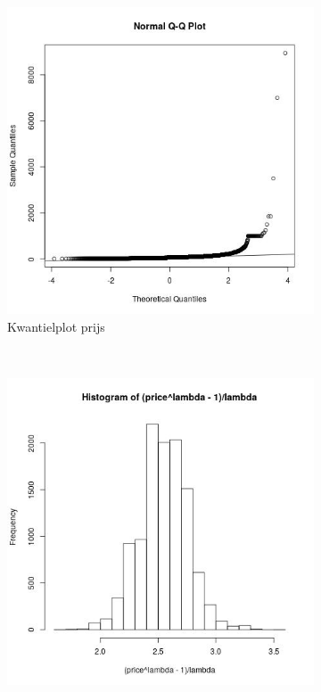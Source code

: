 \documentclass[a4paper,kulak]{kulakarticle} %
\begin{document}
\begin{figure}[H]
\begin{subfigure}[b]{0.23\textwidth}
		\includegraphics[width=\textwidth]{qqp.jpg}
		\caption{Kwantielplot prijs}
		\label{fig:qqp}
	\end{subfigure}
	~
	\begin{subfigure}[b]{0.23\textwidth}
		\includegraphics[width=\textwidth]{prijsB.jpg}

\end{subfigure}
\end{figure}
\end{document}
